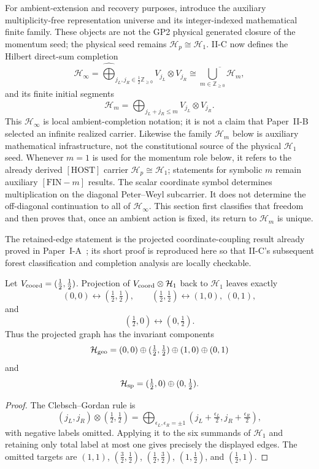 \documentclass[12pt,a4paper]{article}
\begin{document}
For ambient-extension and recovery purposes, introduce the auxiliary
multiplicity-free representation universe and its integer-indexed mathematical
finite family.  These objects are not the GP2 physical generated closure of
the momentum seed; the physical seed remains
\(\mathcal H_p\cong\mathcal H_1\).  II-C now defines the Hilbert direct-sum
completion
\[
\mathcal H_\infty
=
\widehat{\bigoplus}_{j_L,j_R\in\frac12\mathbb Z_{\ge0}}
V_{j_L}\otimes V_{j_R}
\cong
\overline{\bigcup_{m\in\mathbb Z_{\ge0}}\mathcal H_m},
\]
and its finite initial segments
\[
\mathcal H_m
=
\bigoplus_{j_L+j_R\le m}V_{j_L}\otimes V_{j_R}.
\]
This \(\mathcal H_\infty\) is local ambient-completion notation; it is not a
claim that Paper~II-B selected an infinite realized carrier.  Likewise the
family \(\mathcal H_m\) below is auxiliary mathematical infrastructure, not
the constitutional source of the physical \(\mathcal H_1\) seed.
Whenever \(m=1\) is used for the momentum role below, it refers to the
already derived \([\mathrm{HOST}]\) carrier \(\mathcal H_p\cong\mathcal H_1\);
statements for symbolic \(m\) remain auxiliary \([\mathrm{FIN}{-}m]\) results.
The scalar coordinate symbol determines multiplication on the diagonal
Peter--Weyl subcarrier.  It does not determine the off-diagonal continuation
to all of \(\mathcal H_\infty\).  This section first classifies that freedom
and then proves that, once an ambient action is fixed, its return to
\(\mathcal H_m\) is unique.

\begin{proposition}[Projected coordinate graph at \(m=1\)]
\label{p2:prop:h1-coordinate-coupling-graph}
The retained-edge statement is the projected coordinate-coupling result
already proved in Paper~I-A~\cite{Kugelmann2026a}; its short proof is reproduced
here so that II-C's subsequent forest classification and completion analysis
are locally checkable.

Let \(V_{\rm coord}=(\tfrac12,\tfrac12)\).  Projection of
\(V_{\rm coord}\otimes\mathcal H_1\) back to \(\mathcal H_1\) leaves exactly
\[
(0,0)\leftrightarrow(\tfrac12,\tfrac12),\qquad
(\tfrac12,\tfrac12)\leftrightarrow(1,0),\ (0,1),
\]
and
\[
(\tfrac12,0)\leftrightarrow(0,\tfrac12).
\]
Thus the projected graph has the invariant components
\[
\mathcal H_{\rm geo}
=
(0,0)\oplus(\tfrac12,\tfrac12)\oplus(1,0)\oplus(0,1)
\]
and
\[
\mathcal H_{\rm sp}
=
(\tfrac12,0)\oplus(0,\tfrac12).
\]
\end{proposition}

\begin{proof}
The Clebsch--Gordan rule is
\[
(j_L,j_R)\otimes(\tfrac12,\tfrac12)
=
\bigoplus_{\epsilon_L,\epsilon_R=\pm1}
(j_L+\tfrac{\epsilon_L}{2},j_R+\tfrac{\epsilon_R}{2}),
\]
with negative labels omitted.  Applying it to the six summands of
\(\mathcal H_1\) and retaining only total label at most one gives precisely
the displayed edges.  The omitted targets are
\((1,1)\), \((\tfrac32,\tfrac12)\),
\((\tfrac12,\tfrac32)\), \((1,\tfrac12)\), and
\((\tfrac12,1)\).
\end{proof}
\end{document}
